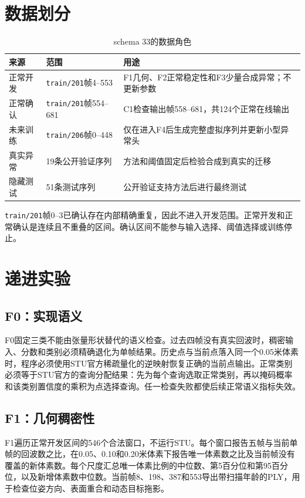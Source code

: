 \documentclass[UTF8,a4paper,zihao=5,fontset=none]{ctexart}
\begin{document}
\section{数据划分}

\begin{table}[htbp]
\centering
\caption{schema 33的数据角色}
\begin{tabularx}{\textwidth}{L{2.2cm}L{2.6cm}Y}
\toprule
来源 & 范围 & 用途 \\
\midrule
正常开发 & \texttt{train/201}帧4--553 & F1几何、F2正常稳定性和F3少量合成异常；不更新参数 \\
正常确认 & \texttt{train/201}帧554--681 & C1检查输出帧558--681，共124个正常在线输出 \\
未来训练 & \texttt{train/206}帧0--448 & 仅在进入F4后生成完整虚拟序列并更新小型异常头 \\
真实异常 & 19条公开验证序列 & 方法和阈值固定后检验合成到真实的迁移 \\
隐藏测试 & 51条测试序列 & 公开验证支持方法后进行最终测试 \\
\bottomrule
\end{tabularx}
\end{table}

\texttt{train/201}帧0--3已确认存在内部精确重复，因此不进入开发范围。正常开发和正常确认是连续且不重叠的区间。确认区间不能参与输入选择、阈值选择或训练停止。

\section{递进实验}

\subsection{F0：实现语义}

F0固定三类不能由张量形状替代的语义检查。过去四帧没有真实回波时，稠密输入、分数和类别必须精确退化为单帧结果。历史点与当前点落入同一个0.05米体素时，程序必须使用STU官方稀疏量化的逆映射恢复正确的当前点输出。正常类别必须等于STU官方的查询分配结果：先为每个查询选取正常类别，再以掩码概率和该类别置信度的乘积为点选择查询。任一检查失败都使后续正常语义指标失效。

\subsection{F1：几何稠密性}

F1遍历正常开发区间的546个合法窗口，不运行STU。每个窗口报告五帧与当前单帧的回波数之比，在0.05、0.10和0.20米体素下报告唯一体素数之比及当前帧没有覆盖的新体素数。每个尺度汇总唯一体素比例的中位数、第5百分位和第95百分位，以及新增体素数中位数。当前帧8、198、387和553导出带扫描年龄的PLY，用于检查位姿方向、表面重合和动态目标拖影。
\end{document}

